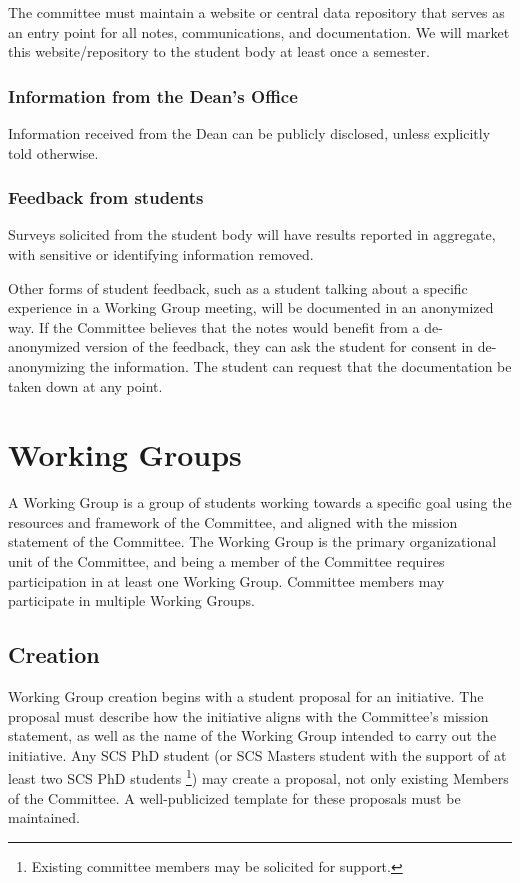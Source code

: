 \documentclass{article}
\begin{document}
The committee must maintain a website or central data repository that serves as an entry point for all notes, communications, and documentation. 
We will market this website/repository to the student body at least once a semester.

\subsubsection{Information from the Dean's Office}

Information received from the Dean can be publicly disclosed, unless explicitly told otherwise.

\subsubsection{Feedback from students}

Surveys solicited from the student body will have results reported in aggregate, with sensitive or identifying information removed. 

Other forms of student feedback, such as a student talking about a specific experience in a Working Group meeting, will be documented in an anonymized way.   
If the Committee believes that the notes would benefit from a de-anonymized version of the feedback, they can ask the student for consent in de-anonymizing the information.
The student can request that the documentation be taken down at any point.

\section{Working Groups} \label{sec:workinggroup}

A Working Group is a group of students working towards a specific goal using the resources and framework of the Committee, and aligned with the mission statement of the Committee. The Working Group is the primary organizational unit of the Committee, and being a member of the Committee requires participation in at least one Working Group. Committee members may participate in multiple Working Groups.

\subsection{Creation} \label{sec:creation}
Working Group creation begins with a student proposal for an initiative. The proposal must describe how the initiative aligns with the Committee's mission statement, as well as the name of the Working Group intended to carry out the initiative. Any SCS PhD student (or SCS Masters student with the support of at least two SCS PhD students \footnote{Existing committee members may be solicited for support.}) may create a proposal, not only existing Members of the Committee. A well-publicized template for these proposals must be maintained.
\end{document}
